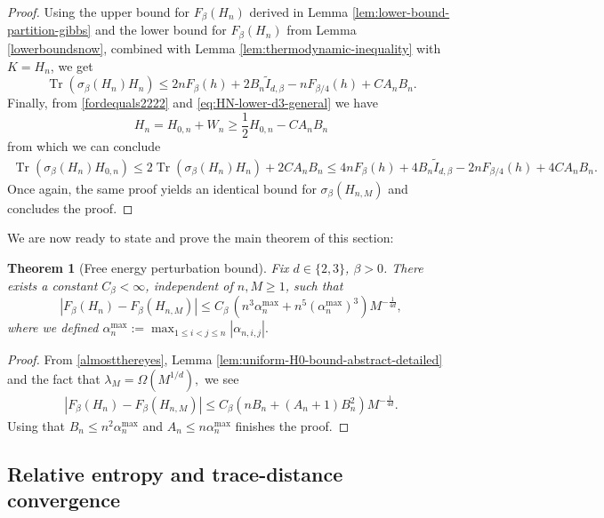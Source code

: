 \documentclass[11pt]{amsart}
\newcommand{\1}{\mathbbm{1}}
\newcommand{\Tr}{\operatorname{Tr}}
\theoremstyle{plain}
\newtheorem{theorem}{Theorem}[section]
\theoremstyle{definition}
\theoremstyle{remark}
\numberwithin{equation}{section}
\begin{document}
\begin{proof}
 Using the upper bound for \(F_\beta(H_n)\) derived in Lemma \ref{lem:lower-bound-partition-gibbs} and the lower bound for \(F_\beta(H_n)\) from Lemma \ref{lowerboundsnow}, combined with Lemma \ref{lem:thermodynamic-inequality} with \(K=H_n\), we get 
\[
\Tr(\sigma_\beta(H_n) H_n)
\le
2nF_\beta(h)+2B_n\widetilde{I}_{d,\beta}-nF_{\beta/4}(h)+ CA_n B_n.
\]
Finally, from \eqref{fordequals2222} and \eqref{eq:HN-lower-d3-general} we have
\begin{equation}
\label{eq:HN-lower-d3}
H_n=H_{0,n}+W_n \ge
\frac{1}{2} H_{0,n}- CA_nB_n
\end{equation}
from which we can conclude 
\begin{align*}
    \Tr(\sigma_\beta(H_n)H_{0,n})\le 2\Tr(\sigma_\beta(H_n)H_{n}) + 2CA_nB_n \le4nF_\beta(h)+4B_n\widetilde{I}_{d,\beta}-2nF_{\beta/4}(h)+ 4CA_n B_n. 
\end{align*}
 Once again, the same proof yields an identical bound for $\sigma_\beta(H_{n,M})$ and concludes the proof. 
\end{proof}

\noindent We are now ready to state and prove the main theorem of this section:

\begin{theorem}[Free energy perturbation bound]\label{thmfreenregyblabla}
Fix $d\in\{2,3\}$, $\beta>0$. There exists a constant $C_\beta<\infty$, independent of $n,M\ge 1$, such that
\[
|F_\beta(H_n)-F_{\beta}(H_{n,M})|
\le C_\beta\,\left(n^{3}\alpha^{\max}_n + n^5 \left(\alpha^{\max}_n\right)^3\right)M^{-\frac{1}{4d}},
\]
where we defined $\alpha^{\max}_{n} :=\max_{1\le i<j\le n} |\alpha_{n,i,j}|.$
\end{theorem}

\begin{proof}
From \eqref{almostthereyes}, Lemma \ref{lem:uniform-H0-bound-abstract-detailed} and the fact that $\lambda_M=\Omega(M^{1/d}),$ we see 
\begin{align*}
  |F_\beta(H_n)-F_{\beta}(H_{n,M})|
\le C_\beta \left(nB_n +(A_n+1)B^2_n \right)M^{-\frac{1}{4d}}.  
\end{align*}
Using that \(B_n\le n^{2} \alpha^{\max}_{n}\) and $A_n\le n \alpha^{\max}_{n}$ finishes the proof. 
\end{proof}


\subsection{Relative entropy and trace-distance convergence}
\label{sec:EntropyTraceDistanceConv}
\end{document}
